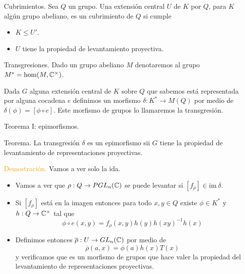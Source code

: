 \documentclass[aspectratio=169, 9pt]{beamer}
\begin{document}
\begin{frame}[fragile]{Cubrimientos.}
Sea $Q$ un grupo. Una extensión central $U$ de $K$ por $Q$, para $K$ algún grupo abeliano, es un \alert{cubrimiento} de $Q$ si cumple
\begin{itemize}
	\item $K \le U'$.
	\item $U$ tiene la propiedad de levantamiento proyectiva.
\end{itemize}
\end{frame}

\begin{frame}[fragile]{Transgresiones.}
Dado un grupo abeliano $M$ denotaremos al grupo $M^* = \text{hom}(M, \Bbb C^\times)$.
\pause
\bigskip


Dada $G$ alguna extensión central de $K$ sobre $Q$ que sabemos está representada por alguna cocadena $e$ definimos un morfismo $\delta: K^{*} \to M(Q)$ por medio de $\delta(\phi) = [\phi \circ e].$ Este morfismo de grupos lo llamaremos la \alert{transgresión}.
\end{frame}

\begin{frame}[fragile]{Teorema I: epimorfismos.}
\begin{alertblock}{Teorema.}
	La transgresión $\delta$ es un epimorfismo sii $G$ tiene la propiedad de levantamiento de representaciones proyectivas.
\end{alertblock}
\textcolor{orange}{Demostración.} Vamos a ver solo la ida.
\begin{itemize}
	\item Vamos a ver que $\rho:Q \to PGL_n(\Bbb C)$ se puede levantar si $[f_\rho] \in \text{im} \ \delta$.
	\item Si $[f_\rho]$ está en la imagen entonces para todo $x,y \in Q$ existe $\phi \in K^*$ y $h:Q \to \Bbb C^\times$ tal que
	\begin{equation*}
		\phi \circ e (x,y) = f_\rho(x,y)h(y)h(xy)^{-1}h(x)
	\end{equation*}
	\item Definimos entonces $\overline \rho:U \to GL_n(\Bbb C)$ por medio de
	\begin{equation*}
		\overline \rho(a,x) = \phi(a)h(x)T(x)
	\end{equation*}
	y verificamos que es un morfismo de grupos que hace valer la propiedad del levantamiento de representaciones proyectivas.
\end{itemize}
\end{frame}
\end{document}
